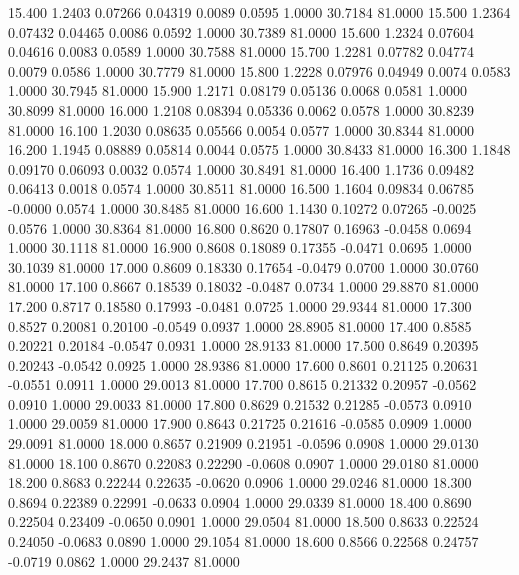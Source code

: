   15.400   1.2403   0.07266   0.04319   0.0089   0.0595   1.0000  30.7184  81.0000
  15.500   1.2364   0.07432   0.04465   0.0086   0.0592   1.0000  30.7389  81.0000
  15.600   1.2324   0.07604   0.04616   0.0083   0.0589   1.0000  30.7588  81.0000
  15.700   1.2281   0.07782   0.04774   0.0079   0.0586   1.0000  30.7779  81.0000
  15.800   1.2228   0.07976   0.04949   0.0074   0.0583   1.0000  30.7945  81.0000
  15.900   1.2171   0.08179   0.05136   0.0068   0.0581   1.0000  30.8099  81.0000
  16.000   1.2108   0.08394   0.05336   0.0062   0.0578   1.0000  30.8239  81.0000
  16.100   1.2030   0.08635   0.05566   0.0054   0.0577   1.0000  30.8344  81.0000
  16.200   1.1945   0.08889   0.05814   0.0044   0.0575   1.0000  30.8433  81.0000
  16.300   1.1848   0.09170   0.06093   0.0032   0.0574   1.0000  30.8491  81.0000
  16.400   1.1736   0.09482   0.06413   0.0018   0.0574   1.0000  30.8511  81.0000
  16.500   1.1604   0.09834   0.06785  -0.0000   0.0574   1.0000  30.8485  81.0000
  16.600   1.1430   0.10272   0.07265  -0.0025   0.0576   1.0000  30.8364  81.0000
  16.800   0.8620   0.17807   0.16963  -0.0458   0.0694   1.0000  30.1118  81.0000
  16.900   0.8608   0.18089   0.17355  -0.0471   0.0695   1.0000  30.1039  81.0000
  17.000   0.8609   0.18330   0.17654  -0.0479   0.0700   1.0000  30.0760  81.0000
  17.100   0.8667   0.18539   0.18032  -0.0487   0.0734   1.0000  29.8870  81.0000
  17.200   0.8717   0.18580   0.17993  -0.0481   0.0725   1.0000  29.9344  81.0000
  17.300   0.8527   0.20081   0.20100  -0.0549   0.0937   1.0000  28.8905  81.0000
  17.400   0.8585   0.20221   0.20184  -0.0547   0.0931   1.0000  28.9133  81.0000
  17.500   0.8649   0.20395   0.20243  -0.0542   0.0925   1.0000  28.9386  81.0000
  17.600   0.8601   0.21125   0.20631  -0.0551   0.0911   1.0000  29.0013  81.0000
  17.700   0.8615   0.21332   0.20957  -0.0562   0.0910   1.0000  29.0033  81.0000
  17.800   0.8629   0.21532   0.21285  -0.0573   0.0910   1.0000  29.0059  81.0000
  17.900   0.8643   0.21725   0.21616  -0.0585   0.0909   1.0000  29.0091  81.0000
  18.000   0.8657   0.21909   0.21951  -0.0596   0.0908   1.0000  29.0130  81.0000
  18.100   0.8670   0.22083   0.22290  -0.0608   0.0907   1.0000  29.0180  81.0000
  18.200   0.8683   0.22244   0.22635  -0.0620   0.0906   1.0000  29.0246  81.0000
  18.300   0.8694   0.22389   0.22991  -0.0633   0.0904   1.0000  29.0339  81.0000
  18.400   0.8690   0.22504   0.23409  -0.0650   0.0901   1.0000  29.0504  81.0000
  18.500   0.8633   0.22524   0.24050  -0.0683   0.0890   1.0000  29.1054  81.0000
  18.600   0.8566   0.22568   0.24757  -0.0719   0.0862   1.0000  29.2437  81.0000
